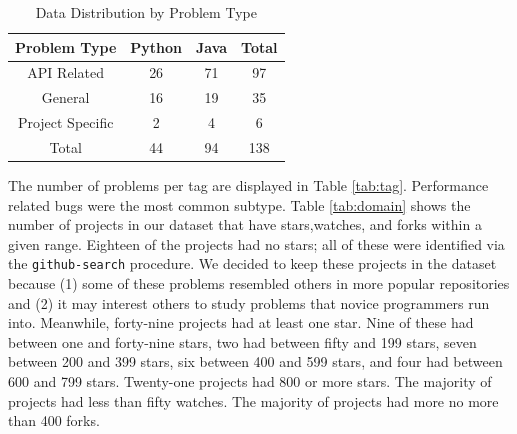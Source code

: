 \documentclass[sigconf]{acmart}
\begin{document}
\begin{table}

  \caption{Data Distribution by Problem Type}
  \label{tab:type}
\begin{tabular}{ c c c c }
  \toprule
  Problem Type & Python & Java & Total \\
  \midrule
  API Related       &	26  &  71 &  97\\
  General    		&	16  &  19 &  35\\
  Project Specific  &	 2  &   4 &   6\\
  \midrule
  Total      		&	44  &  94 &  138\\
  \bottomrule
\end{tabular}
\end{table}

The number of problems per tag are displayed in Table \ref{tab:tag}. Performance related bugs were the most common subtype. Table \ref{tab:domain} shows the number of projects in our dataset that have stars,watches, and forks within a given range. Eighteen of the projects had no stars; all of these were identified via the \texttt{github-search} procedure. We decided to keep these projects in the dataset because (1) some of these problems resembled others in more popular repositories and (2) it may interest others to study problems that novice programmers run into. Meanwhile, forty-nine projects had at least one star. Nine of these had between one and forty-nine stars, two had between fifty and 199 stars, seven between 200 and 399 stars, six between 400 and 599 stars, and four had between 600 and 799 stars. Twenty-one projects had 800 or more stars. The majority of projects had less than fifty watches. The majority of  projects had more no more than 400 forks.
\end{document}
